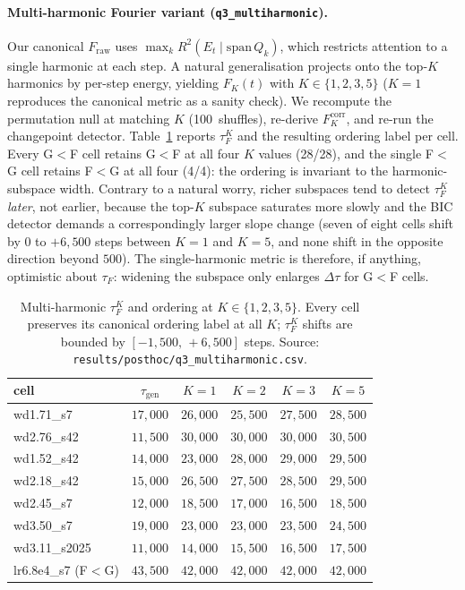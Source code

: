 \documentclass{article}
\newcommand{\taug}{\tau_{\mathrm{gen}}}
\newcommand{\tauf}{\tau_{F}}
\newcommand{\Dtau}{\Delta\tau}
\begin{document}
\paragraph{Multi-harmonic Fourier variant (\texttt{q3\_multiharmonic}).}
Our canonical $F_{\mathrm{raw}}$ uses $\max_k R^2(E_t\mid\mathrm{span}\,Q_k)$,
which restricts attention to a single harmonic at each step.
A natural generalisation projects onto the top-$K$ harmonics by
per-step energy, yielding $F_K(t)$ with $K\in\{1,2,3,5\}$
($K{=}1$ reproduces the canonical metric as a sanity check).
We recompute the permutation null at matching $K$ (100~shuffles),
re-derive $F_K^{\mathrm{corr}}$, and re-run the changepoint detector.
Table~\ref{tab:q3_multiharmonic} reports $\tauf^K$ and
the resulting ordering label per cell.
Every G$<$F cell retains G$<$F at all four $K$ values
(28/28), and the single F$<$G cell retains F$<$G at all four
(4/4): the ordering is invariant to the harmonic-subspace width.
Contrary to a natural worry, richer subspaces tend to detect
$\tauf^K$ \emph{later}, not earlier, because the top-$K$ subspace
saturates more slowly and the BIC detector demands a correspondingly
larger slope change (seven of eight cells shift by $0$ to
$+6{,}500$ steps between $K{=}1$ and $K{=}5$, and none shift in
the opposite direction beyond $500$).
The single-harmonic metric is therefore, if anything, optimistic
about $\tauf$: widening the subspace only enlarges $\Dtau$ for
G$<$F cells.
\begin{table}[tbp]
  \centering
  \caption{Multi-harmonic $\tauf^K$ and ordering at
    $K\in\{1,2,3,5\}$.
    Every cell preserves its canonical ordering label at all $K$;
    $\tauf^K$ shifts are bounded by $[-1{,}500,\,+6{,}500]$ steps.
    Source: \texttt{results/posthoc/q3\_multiharmonic.csv}.}
  \label{tab:q3_multiharmonic}
  \small
  \begin{tabular}{lccccc}
    \toprule
    cell & $\taug$ & $K{=}1$ & $K{=}2$ & $K{=}3$ & $K{=}5$ \\
    \midrule
    wd1.71\_s7   & $17{,}000$ & $26{,}000$ & $25{,}500$ & $27{,}500$ & $28{,}500$ \\
    wd2.76\_s42  & $11{,}500$ & $30{,}000$ & $30{,}000$ & $30{,}000$ & $30{,}500$ \\
    wd1.52\_s42  & $14{,}000$ & $23{,}000$ & $28{,}000$ & $29{,}000$ & $29{,}500$ \\
    wd2.18\_s42  & $15{,}000$ & $26{,}500$ & $27{,}500$ & $28{,}500$ & $29{,}500$ \\
    wd2.45\_s7   & $12{,}000$ & $18{,}500$ & $17{,}000$ & $16{,}500$ & $18{,}500$ \\
    wd3.50\_s7   & $19{,}000$ & $23{,}000$ & $23{,}000$ & $23{,}500$ & $24{,}500$ \\
    wd3.11\_s2025 & $11{,}000$ & $14{,}000$ & $15{,}500$ & $16{,}500$ & $17{,}500$ \\
    lr6.8e4\_s7 (F$<$G) & $43{,}500$ & $42{,}000$ & $42{,}000$ & $42{,}000$ & $42{,}000$ \\
    \bottomrule
  \end{tabular}
\end{table}
\end{document}
